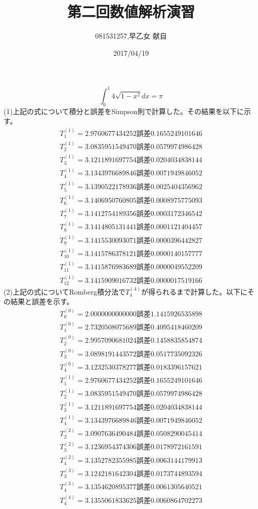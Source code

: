 \documentclass[]{jsarticle}
\title{第二回数値解析演習}
\author{081531257,早乙女 献自}
\date{2017/04/19}
\begin{document}
\maketitle
$$\int_0^1 4\sqrt{1-x^2}dx = \pi$$
\noindent
(1)上記の式について積分と誤差をSimpson則で計算した。その結果を以下に示す。\\
\begin{eqnarray}
T^{(1)}_1=2.9760677434252 誤差0.1655249101646\nonumber\\
T^{(1)}_2=3.0835951549470 誤差0.0579974986428\nonumber\\
T^{(1)}_3=3.1211891697754 誤差0.0204034838144\nonumber\\
T^{(1)}_4=3.1343976689846 誤差0.0071949846052\nonumber\\
T^{(1)}_5=3.1390522178936 誤差0.0025404356962\nonumber\\
T^{(1)}_6=3.1406950760805 誤差0.0008975775093\nonumber\\
T^{(1)}_7=3.1412754189356 誤差0.0003172346542\nonumber\\
T^{(1)}_8=3.1414805131441 誤差0.0001121404457\nonumber\\
T^{(1)}_9=3.1415530093071 誤差0.0000396442827\nonumber\\
T^{(1)}_10=3.1415786378121 誤差0.0000140157777\nonumber\\
T^{(1)}_11=3.1415876983689 誤差0.0000049552209\nonumber\\
T^{(1)}_12=3.1415909016732 誤差0.0000017519166\nonumber
\end{eqnarray}
(2)上記の式についてRomberg積分法で$T_4^{(4)}$が得られるまで計算した。以下にその結果と誤差を示す。\\
\begin{eqnarray}
T^{(0)}_0=2.0000000000000 誤差1.1415926535898\nonumber\\
T^{(0)}_1=2.7320508075689 誤差0.4095418460209\nonumber\\
T^{(0)}_2=2.9957090681024 誤差0.1458835854874\nonumber\\
T^{(0)}_3=3.0898191443572 誤差0.0517735092326\nonumber\\
T^{(0)}_4=3.1232530378277 誤差0.0183396157621\nonumber\\
T^{(1)}_1=2.9760677434252 誤差0.1655249101646\nonumber\\
T^{(1)}_2=3.0835951549470 誤差0.0579974986428\nonumber\\
T^{(1)}_3=3.1211891697754 誤差0.0204034838144\nonumber\\
T^{(1)}_4=3.1343976689846 誤差0.0071949846052\nonumber\\
T^{(2)}_2=3.0907636490484 誤差0.0508290045414\nonumber\\
T^{(2)}_3=3.1236954374306 誤差0.0178972161591\nonumber\\
T^{(2)}_4=3.1352782355985 誤差0.0063144179913\nonumber\\
T^{(3)}_3=3.1242181642304 誤差0.0173744893594\nonumber\\
T^{(3)}_4=3.1354620895377 誤差0.0061305640521\nonumber\\
T^{(4)}_4=3.1355061833625 誤差0.0060864702273\nonumber
\end{eqnarray}
\end{document}
